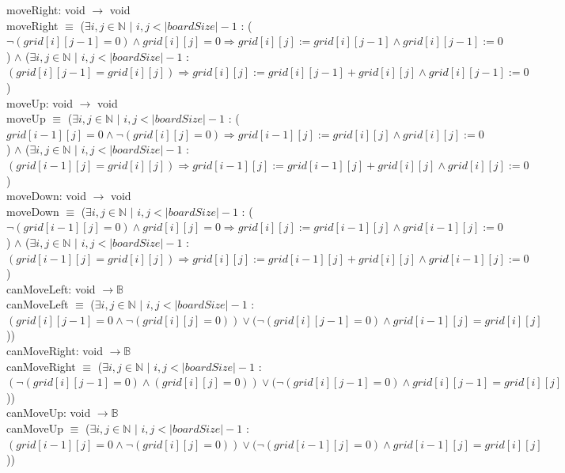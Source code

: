 \documentclass[12pt]{article}
\begin{document}
\noindent moveRight: void $\rightarrow$ void \\
moveRight $\equiv$ ($\exists i, j \in \mathbb{N}$ $|$ $i,j < |boardSize|-1$ : ($\lnot (grid[i][j-1]=0) \wedge grid[i][j]=0 \Rightarrow grid[i][j] := grid[i][j-1] \wedge grid[i][j-1]:=0$) $\wedge$ ($\exists i, j \in \mathbb{N}$ $|$ $i,j < |boardSize|-1$ : $(grid[i][j-1] = grid[i][j]) \Rightarrow grid[i][j] := grid[i][j-1] + grid[i][j] \wedge grid[i][j-1]:=0$)\\

\noindent moveUp: void $\rightarrow$ void \\
moveUp $\equiv$ ($\exists i, j \in \mathbb{N}$ $|$ $i,j < |boardSize|-1$ : ($grid[i-1][j]=0 \wedge \lnot(grid[i][j]=0) \Rightarrow grid[i-1][j] := grid[i][j] \wedge grid[i][j]:=0$) $\wedge$ ($\exists i, j \in \mathbb{N}$ $|$ $i,j < |boardSize|-1$ : $(grid[i-1][j] = grid[i][j]) \Rightarrow grid[i-1][j] := grid[i-1][j] + grid[i][j] \wedge grid[i][j]:=0$)\\

\noindent moveDown: void $\rightarrow$ void \\
moveDown $\equiv$ ($\exists i, j \in \mathbb{N}$ $|$ $i,j < |boardSize|-1$ : ($\lnot (grid[i-1][j]=0) \wedge grid[i][j]=0 \Rightarrow grid[i][j] := grid[i-1][j] \wedge grid[i-1][j]:=0$) $\wedge$ ($\exists i, j \in \mathbb{N}$ $|$ $i,j < |boardSize|-1$ : $(grid[i-1][j] = grid[i][j]) \Rightarrow grid[i][j] := grid[i-1][j] + grid[i][j] \wedge grid[i-1][j]:=0$)\\

\noindent canMoveLeft: void $\rightarrow \mathbb{B}$  \\
canMoveLeft $\equiv$ ($\exists i, j \in \mathbb{N}$ $|$ $i,j < |boardSize|-1$ : $(grid[i][j-1]=0 \wedge \lnot(grid[i][j]=0)) \vee (\lnot(grid[i][j-1]=0) \wedge grid[i-1][j]=grid[i][j]$))\\

\noindent canMoveRight: void $\rightarrow \mathbb{B}$  \\
canMoveRight $\equiv$ ($\exists i, j \in \mathbb{N}$ $|$ $i,j < |boardSize|-1$ : $(\lnot(grid[i][j-1]=0) \wedge (grid[i][j]=0)) \vee (\lnot(grid[i][j-1]=0) \wedge grid[i][j-1]=grid[i][j]$))\\

\noindent canMoveUp: void $\rightarrow \mathbb{B}$  \\
canMoveUp $\equiv$ ($\exists i, j \in \mathbb{N}$ $|$ $i,j < |boardSize|-1$ : $(grid[i-1][j]=0 \wedge \lnot(grid[i][j]=0)) \vee (\lnot(grid[i-1][j]=0) \wedge grid[i-1][j]=grid[i][j]$))\\
\end{document}
